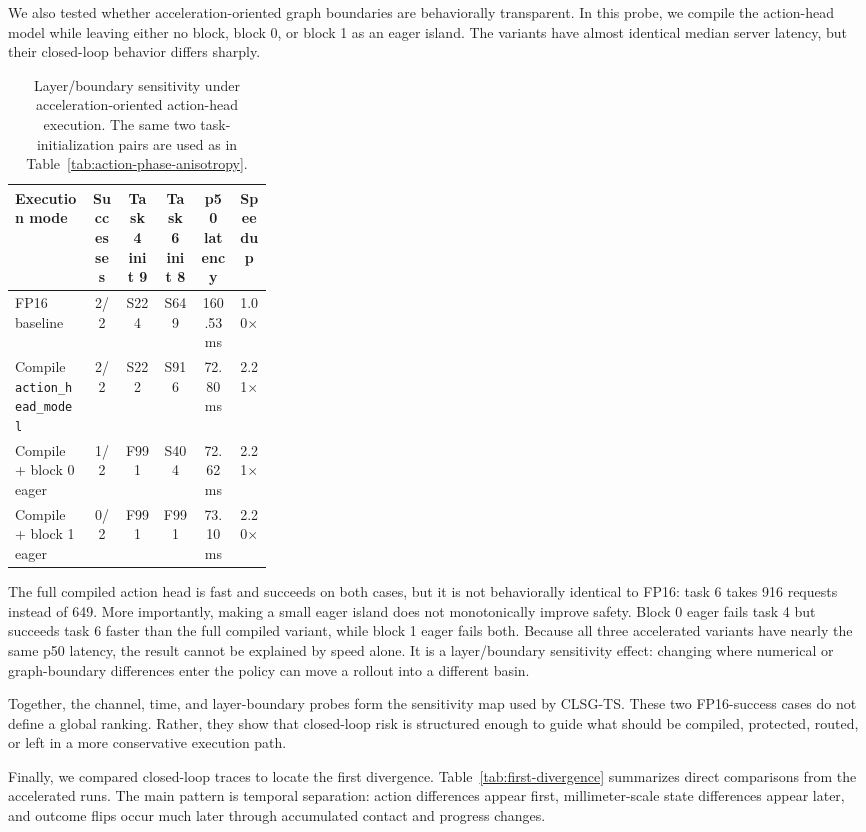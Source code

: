 \documentclass[10pt]{article}
\begin{document}
We also tested whether acceleration-oriented graph boundaries are behaviorally transparent. In this probe, we compile the action-head model while leaving either no block, block 0, or block 1 as an eager island. The variants have almost identical median server latency, but their closed-loop behavior differs sharply.

\begin{table}[H]
\centering
\scriptsize
\setlength{\tabcolsep}{3pt}
\caption{Layer/boundary sensitivity under acceleration-oriented action-head execution. The same two task-initialization pairs are used as in Table~\ref{tab:action-phase-anisotropy}.}
\label{tab:layer-boundary-sensitivity}
\begin{tabular}{p{0.30\linewidth}ccccc}
\toprule
Execution mode & Successes & Task 4 init 9 & Task 6 init 8 & p50 latency & Speedup \\
\midrule
FP16 baseline & 2/2 & S224 & S649 & 160.53 ms & 1.00$\times$ \\
Compile \texttt{action\_head\_model} & 2/2 & S222 & S916 & 72.80 ms & 2.21$\times$ \\
Compile + block 0 eager & 1/2 & F991 & S404 & 72.62 ms & 2.21$\times$ \\
Compile + block 1 eager & 0/2 & F991 & F991 & 73.10 ms & 2.20$\times$ \\
\bottomrule
\end{tabular}
\end{table}

The full compiled action head is fast and succeeds on both cases, but it is not behaviorally identical to FP16: task 6 takes 916 requests instead of 649. More importantly, making a small eager island does not monotonically improve safety. Block 0 eager fails task 4 but succeeds task 6 faster than the full compiled variant, while block 1 eager fails both. Because all three accelerated variants have nearly the same p50 latency, the result cannot be explained by speed alone. It is a layer/boundary sensitivity effect: changing where numerical or graph-boundary differences enter the policy can move a rollout into a different basin.

Together, the channel, time, and layer-boundary probes form the sensitivity map used by CLSG-TS. These two FP16-success cases do not define a global ranking. Rather, they show that closed-loop risk is structured enough to guide what should be compiled, protected, routed, or left in a more conservative execution path.

Finally, we compared closed-loop traces to locate the first divergence. Table~\ref{tab:first-divergence} summarizes direct comparisons from the accelerated runs. The main pattern is temporal separation: action differences appear first, millimeter-scale state differences appear later, and outcome flips occur much later through accumulated contact and progress changes.
\end{document}
